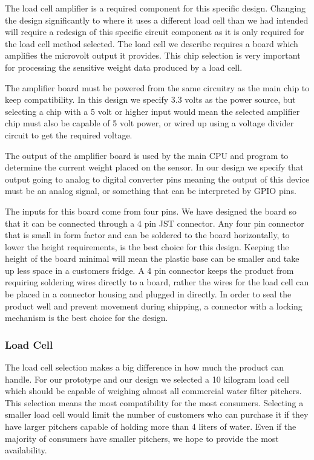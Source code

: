 The load cell amplifier is a required component for this specific design. Changing the design significantly to where it uses a different load cell than we had intended will require a redesign of this specific circuit component as it is only required for the load cell method selected. The load cell we describe requires a board which amplifies the microvolt output it provides. This chip selection is very important for processing the sensitive weight data produced by a load cell. 

The amplifier board must be powered from the same circuitry as the main chip to keep compatibility. In this design we specify 3.3 volts as the power source, but selecting a chip with a 5 volt or higher input would mean the selected amplifier chip must also be capable of 5 volt power, or wired up using a voltage divider circuit to get the required voltage.

The output of the amplifier board is used by the main CPU and program to determine the current weight placed on the sensor. In our design we specify that output going to analog to digital converter pins meaning the output of this device must be an analog signal, or something that can be interpreted by GPIO pins. 

The inputs for this board come from four pins. We have designed the board so that it can be connected through a 4 pin JST connector. Any four pin connector that is small in form factor and can be soldered to the board horizontally, to lower the height requirements, is the best choice for this design. Keeping the height of the board minimal will mean the plastic base can be smaller and take up less space in a customers fridge. A 4 pin connector keeps the product from requiring soldering wires directly to a board, rather the wires for the load cell can be placed in a connector housing and plugged in directly. In order to seal the product well and prevent movement during shipping, a connector with a locking mechanism is the best choice for the design. 

\subsubsection{Load Cell}

The load cell selection makes a big difference in how much the product can handle. For our prototype and our design we selected a 10 kilogram load cell which should be capable of weighing almost all commercial water filter pitchers. This selection means the most compatibility for the most consumers. Selecting a smaller load cell would limit the number of customers who can purchase it if they have larger pitchers capable of holding more than 4 liters of water. Even if the majority of consumers have smaller pitchers, we hope to provide the most availability. 

